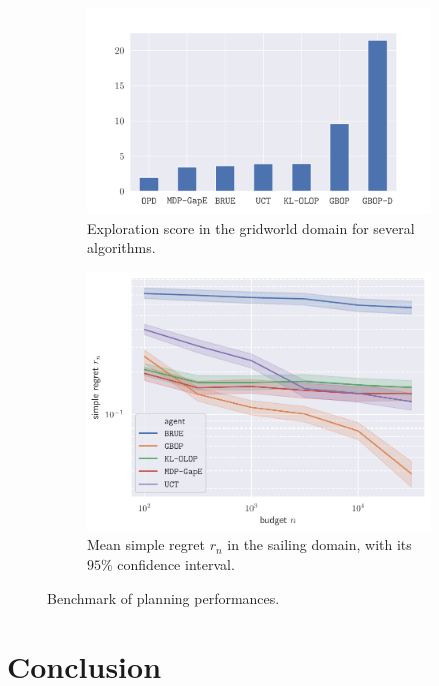 \documentclass[runningheads]{llncs}
\begin{document}
\begin{figure}[ht]
	\centering
	\begin{subfigure}[b]{0.49\textwidth}
		\includegraphics[trim = {0 0 0 0}, clip, width=\linewidth]{img/score.pdf}
		\caption{Exploration score in the gridworld domain for several algorithms.}
		\label{fig:exploration}
	\end{subfigure}
	\hfill%
	\begin{subfigure}[b]{0.49\textwidth}
		\includegraphics[trim = {0 0 0 0}, clip, width=\linewidth]{img/simple_regret.pdf}
		\caption{Mean simple regret $r_n$ in the sailing domain, with its $95\%$ confidence interval.}
		\label{fig:sailing}
	\end{subfigure}
	\caption{Benchmark of planning performances.}
\end{figure}

\section*{Conclusion}
\end{document}
